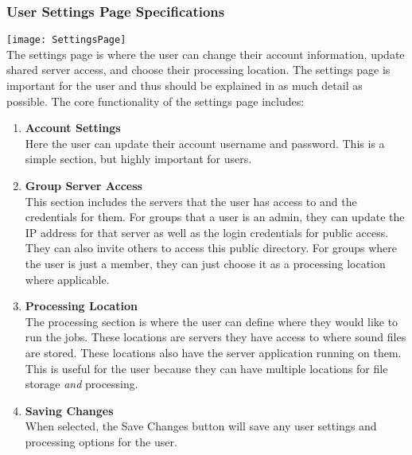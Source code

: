 \subsubsection{User Settings Page Specifications}
\texttt{[image: SettingsPage]}\\
The settings page is where the user can change their account information, update shared server access, and choose their processing location. The settings page is important for the user and thus should be explained in as much detail as possible. The core functionality of the settings page includes:\\
\begin{enumerate}
    \item \textbf{Account Settings}\\ Here the user can update their account username and password. This is a simple section, but highly important for users.
    \item \textbf{Group Server Access}\\ This section includes the servers that the user has access to and the credentials for them. For groups that a user is an admin, they can update the IP address for that server as well as the login credentials for public access. They can also invite others to access this public directory. For groups where the user is just a member, they can just choose it as a processing location where applicable.
    \item \textbf{Processing Location}\\ The processing section is where the user can define where they would like to run the jobs. These locations are servers they have access to where sound files are stored. These locations also have the server application running on them. This is useful for the user because they can have multiple locations for file storage \textit{and} processing.
    \item \textbf{Saving Changes}\\ When selected, the Save Changes button will save any user settings and processing options for the user.
\end{enumerate}